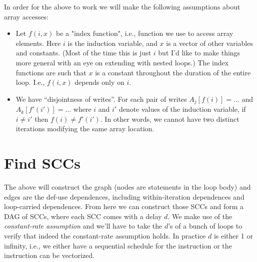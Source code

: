 \documentclass{article}
\begin{document}
In order for the above to work we will make the following assumptions about array accesses:

\begin{itemize}

\item Let $f(i,x)$ be a "index function", i.e., function we use to access array elements. Here $i$ is the induction variable, and $x$ is a vector of other variables and constants. (Most of the time this is just $i$ but I'd like to make things more general with an eye on extending with nested loops.) The index functions are such that $x$ is a constant throughout the duration of the entire loop. I.e., $f(i,x)$ depends only on $i$. 

\item We have ``disjointness of writes''. For each pair of writes $A_j[f(i)] = ... $ and $A_k[f'(i')] = ... $ where $i$ and $i'$ denote values of the induction variable, if $i \neq i'$ then $f(i) \neq f'(i')$. In other words, we cannot have two distinct iterations modifying the same array location.

\end{itemize}

\section{Find SCCs}

The above will construct the graph (nodes are statements in the loop body) and edges are the def-use dependences, including within-iteration dependences and loop-carried dependences. From here we can construct those SCCs and form a DAG of SCCs, where each SCC comes with a delay $d$. We make use of the \emph{constant-rate assumption} and we'll have to take the $d$'s of a bunch of loops to verify that indeed the constant-rate assumption holds. In practice $d$ is either 1 or infinity, i.e., we either have a sequential schedule for the instruction or the instruction can be vectorized. 
\end{document}
